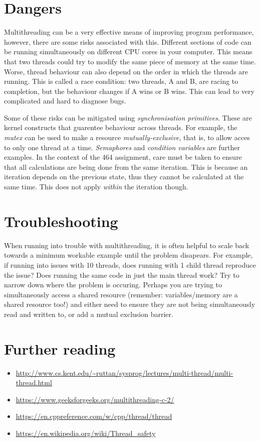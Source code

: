 \documentclass[a4paper,11pt]{article}
\begin{document}
\section{Dangers}

Multithreading can be a very effective means of improving program performance,
however, there are some risks associated with this. Different sections of code
can be running simultaneously on different CPU cores in your computer. This
means that two threads could try to modify the same piece of memory at the same
time. Worse, thread behaviour can also depend on the order in which the threads
are running. This is called a race condition: two threads, A and B, are racing
to completion, but the behaviour changes if A wins or B wins. This can lead to
very complicated and hard to diagnose bugs.

Some of these risks can be mitigated using \emph{synchronisation primitives}.
These are kernel constructs that guarentee behaviour across threads. For
example, the \emph{mutex} can be used to make a resource
\emph{mutually-exclusive}, that is, to allow acces to only one thread at a time.
\emph{Semaphores} and \emph{condition variables} are further examples. In the
context of the 464 assignment, care must be taken to ensure that all
calculations are being done from the same iteration. This is because an
iteration depends on the previous state, thus they cannot be calculated at the
same time. This does not apply \emph{within} the iteration though.


\section{Troubleshooting}

When running into trouble with multithreading, it is often helpful to scale back
towards a minimum workable example until the problem disapears. For example, if
running into issues with 10 threads, does running with 1 child thread reproduce
the issue? Does running the same code in just the main thread work? Try to
narrow down where the problem is occuring. Perhaps you are trying to
simultaneously access a shared resource (remember: variables/memory are a shared
resource too!) and either need to ensure they are not being simultaneously read
and written to, or add a mutual exclusion barrier.

\section{Further reading}

\begin{itemize}
    \item \url{http://www.cs.kent.edu/~ruttan/sysprog/lectures/multi-thread/multi-thread.html}
    \item \url{https://www.geeksforgeeks.org/multithreading-c-2/}
    \item \url{https://en.cppreference.com/w/cpp/thread/thread}
    \item \url{https://en.wikipedia.org/wiki/Thread_safety}
\end{itemize}
\end{document}

